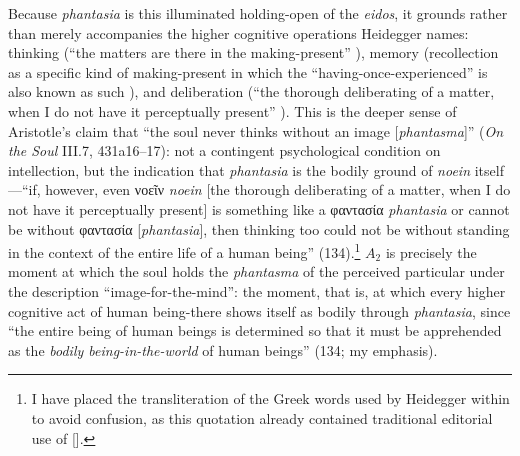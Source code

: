 \documentclass{article}
\newcommand{\gk}[1]{{\greekfont #1}}
\begin{document}
Because \textit{phantasia} is this illuminated holding-open of the \textit{eidos}, it grounds rather than merely accompanies the higher cognitive operations Heidegger names: thinking (``the matters are there in the making-present'' ), memory (recollection as a specific kind of making-present in which the ``having-once-experienced'' is also known as such ), and deliberation (``the thorough deliberating of a matter, when I do not have it perceptually present'' ). This is the deeper sense of Aristotle's claim that ``the soul never thinks without an image [\textit{phantasma}]'' (\textit{On the Soul} III.7, 431a16–17): not a contingent psychological condition on intellection, but the indication that \textit{phantasia} is the bodily ground of \textit{noein} itself---``if, however, even \gk{νοεῖν} {\textit{noein}} [the thorough deliberating of a matter, when I do not have it perceptually present] is something like a \gk{φαντασία} {\textit{phantasia}} or cannot be without \gk{φαντασία} [\textit{phantasia}], then thinking too could not be without standing in the context of the entire life of a human being'' (134).\footnote{I have placed the transliteration of the Greek words used by Heidegger within {} to avoid confusion, as this quotation already contained traditional editorial use of [].} $A_2$ is precisely the moment at which the soul holds the \textit{phantasma} of the perceived particular under the description ``image-for-the-mind'': the moment, that is, at which every higher cognitive act of human being-there shows itself as bodily through \textit{phantasia}, since ``the entire being of human beings is determined so that it must be apprehended as the \textit{bodily being-in-the-world} of human beings'' (134; my emphasis).
\end{document}
